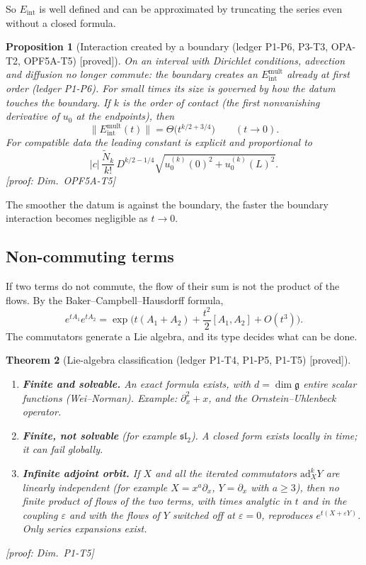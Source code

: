 \documentclass[11pt]{article}
\theoremstyle{plain}
\newtheorem{theorem}{Theorem}[section]
\newtheorem{proposition}[theorem]{Proposition}
\theoremstyle{definition}
\theoremstyle{remark}
\newcommand{\Eint}{E_{\mathrm{int}}}        %
\newcommand{\badge}[2]{\textcolor{#1}{\textsf{\footnotesize[#2]}}}
\newcommand{\proved}[1][]{\badge{cC}{proved#1}}
\newcommand{\led}[1]{\textcolor{cG}{\textsf{\footnotesize(ledger #1)}}}
\newcommand{\dimref}[1]{\textsf{\footnotesize[proof: Dim.~#1]}}
\begin{document}
So $\Eint$ is well defined and can be approximated by truncating the series even without a closed formula.

\begin{proposition}[{Interaction created by a boundary \led{P1-P6, P3-T3, OPA-T2, OPF5A-T5} \proved}]\label{prop:boundary}
On an interval with Dirichlet conditions, advection and diffusion no longer commute: the boundary creates an $\Eint^{\mathrm{mult}}$ already at first order \led{P1-P6}. For small times its size is governed by how the datum touches the boundary. If $k$ is the order of contact (the first nonvanishing derivative of $u_0$ at the endpoints), then
\[
\|\Eint^{\mathrm{mult}}(t)\|=\Theta\big(t^{k/2+3/4}\big)\qquad(t\to0).
\]
For compatible data the leading constant is explicit and proportional to
\[
|c|\,\frac{\tilde N_k}{k!}\,D^{k/2-1/4}\sqrt{u_0^{(k)}(0)^2+u_0^{(k)}(L)^2}.
\]
\dimref{OPF5A-T5}
\end{proposition}

The smoother the datum is against the boundary, the faster the boundary interaction becomes negligible as $t\to0$.

\subsection{Non-commuting terms}\label{f:sec:noncomm}

If two terms do not commute, the flow of their sum is not the product of the flows. By the Baker--Campbell--Hausdorff formula,
\[
e^{tA_1}e^{tA_2}=\exp\Big(t(A_1+A_2)+\frac{t^2}{2}[A_1,A_2]+O(t^3)\Big).
\]
The commutators generate a Lie algebra, and its type decides what can be done.

\begin{theorem}[{Lie-algebra classification \led{P1-T4, P1-P5, P1-T5} \proved}]\label{f:thm:lie}
\begin{enumerate}[label=(\alph*)]
\item \textbf{Finite and solvable.} An exact formula exists, with $d=\dim\mathfrak g$ entire scalar functions (Wei--Norman). Example: $\partial_x^2+x$, and the Ornstein--Uhlenbeck operator.
\item \textbf{Finite, not solvable} (for example $\mathfrak{sl}_2$). A closed form exists locally in time; it can fail globally.
\item \textbf{Infinite adjoint orbit.} If $X$ and all the iterated commutators $\mathrm{ad}_X^kY$ are linearly independent (for example $X=x^a\partial_x$, $Y=\partial_x$ with $a\ge3$), then no finite product of flows of the two terms, with times analytic in $t$ and in the coupling $\varepsilon$ and with the flows of $Y$ switched off at $\varepsilon=0$, reproduces $e^{t(X+\varepsilon Y)}$. Only series expansions exist.
\end{enumerate}
\dimref{P1-T5}
\end{theorem}
\end{document}
